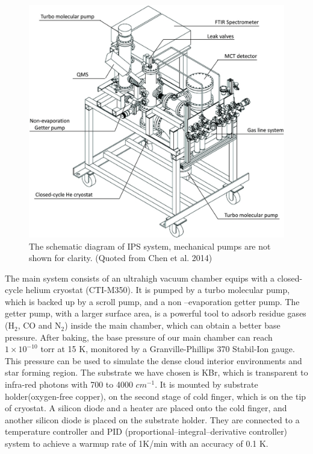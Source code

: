 \begin{figure}
\centering
\includegraphics[width=\textwidth]{figures/chapter2/system.jpg}
\caption{The schematic diagram of IPS system, mechanical pumps are not shown for clarity. (Quoted from Chen et al. 2014)}
\label{fig:system}
\end{figure}

The main system consists of an ultrahigh vacuum chamber equips with a closed-cycle helium cryostat (CTI-M350). It is pumped by a turbo molecular pump, which is backed up by a scroll pump, and a non –evaporation getter pump. The getter pump, with a larger surface area, is a powerful tool to adsorb residue gases (H$_2$, CO and N$_2$) inside the main chamber, which can obtain a better base pressure. After baking, the base pressure of our main chamber can reach $1 \times 10^{-10}$ torr at 15 K, monitored by a Granville-Phillips 370 Stabil-Ion gauge. This pressure can be used to simulate the dense cloud interior environments and star forming region. The substrate we have chosen is KBr, which is transparent to infra-red photons with 700 to 4000 $cm^{-1}$. It is mounted by substrate holder(oxygen-free copper), on the second stage of cold finger, which is on the tip of cryostat. A silicon diode and a heater are placed onto the cold finger, and another silicon diode is placed on the substrate holder. They are connected to a temperature controller and PID (proportional–integral–derivative controller) system to achieve a warmup rate of 1K/min with an accuracy of 0.1 K.

